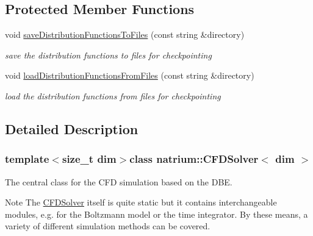 \subsection*{Protected Member Functions}
\begin{DoxyCompactItemize}
\item 
\hypertarget{classnatrium_1_1CFDSolver_a9a2592ea549fa10427c84f0a1e380c1e}{void \hyperlink{classnatrium_1_1CFDSolver_a9a2592ea549fa10427c84f0a1e380c1e}{save\-Distribution\-Functions\-To\-Files} (const string \&directory)}\label{classnatrium_1_1CFDSolver_a9a2592ea549fa10427c84f0a1e380c1e}

\begin{DoxyCompactList}\small\item\em save the distribution functions to files for checkpointing \end{DoxyCompactList}\item 
\hypertarget{classnatrium_1_1CFDSolver_a42245d22e289d079a3b06a0c26f50050}{void \hyperlink{classnatrium_1_1CFDSolver_a42245d22e289d079a3b06a0c26f50050}{load\-Distribution\-Functions\-From\-Files} (const string \&directory)}\label{classnatrium_1_1CFDSolver_a42245d22e289d079a3b06a0c26f50050}

\begin{DoxyCompactList}\small\item\em load the distribution functions from files for checkpointing \end{DoxyCompactList}\end{DoxyCompactItemize}


\subsection{Detailed Description}
\subsubsection*{template$<$size\-\_\-t dim$>$class natrium\-::\-C\-F\-D\-Solver$<$ dim $>$}

The central class for the C\-F\-D simulation based on the D\-B\-E. 

\begin{DoxyNote}{Note}
The \hyperlink{classnatrium_1_1CFDSolver}{C\-F\-D\-Solver} itself is quite static but it contains interchangeable modules, e.\-g. for the Boltzmann model or the time integrator. By these means, a variety of different simulation methods can be covered. 
\end{DoxyNote}

